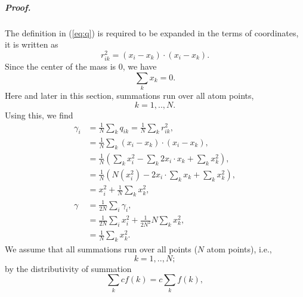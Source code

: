 \documentclass[12pt]{article}
\begin{document}
\subparagraph{Proof.}
The definition in (\ref{eq:q}) is required to be expanded in the terms of coordinates, it is written as
\begin{equation*}
    r_{ik}^2=(x_i-x_k)\cdot(x_i-x_k).
    \label{eq:q_expand}
\end{equation*}
Since the center of the mass is $0$, we have
\begin{equation*}
    \sum_k x_k = 0.
    \label{eq:centerofmass}
\end{equation*}
Here and later in this section, summations run over all atom points,
\begin{equation*}
    k = 1,..,N.
    \label{eq:k_index}
\end{equation*}
Using this, we find
\begin{equation*}
    \begin{split}
        \gamma_i &= \frac{1}{N} \sum_k q_{ik} = \frac{1}{N} \sum_k r_{ik}^2, \\
        &= \frac{1}{N} \sum_k (x_i-x_k) \cdot (x_i-x_k), \\
        &= \frac{1}{N} \left( \sum_k x_i^2 - \sum_k 2 x_i\cdot x_k + \sum_k x_k^2 \right), \\
        &= \frac{1}{N} \left( N (x_i^2) - 2 x_i \cdot \sum_k x_k + \sum_k x_k^2 \right), \\
        &= x_i^2 + \frac{1}{N}\sum_k x_k^2, \\
        \gamma &= \frac{1}{2N}\sum_i \gamma_i, \\
        &= \frac{1}{2N}  \sum_i x_i^2 + \frac{1}{2N^2} N \sum_k x_k^2, \\
        &= \frac{1}{N} \sum_k x_k^2.
    \end{split}
    \label{eq:gamma_i_expand}
\end{equation*}
\iffalse
We assume that all summations run over all points ($N$ atom points), i.e.,
\begin{equation}
    k = 1,..,N;
    \label{eq:k_index}
\end{equation}
by the distributivity of summation
\begin{equation}
    \sum_k c f(k) = c \sum_k f(k),
    \label{eq:distsum}
\end{equation}
\end{document}
